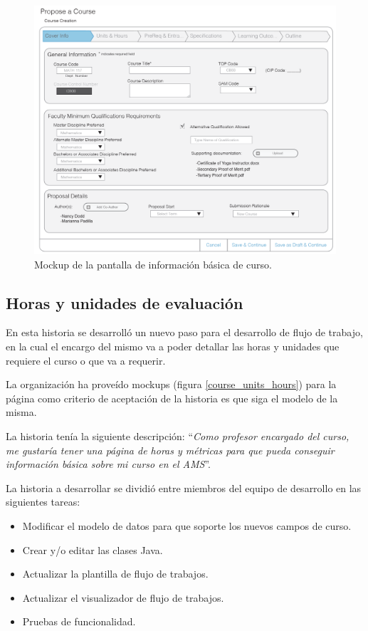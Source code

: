 \begin{figure}[H]
\centering
\includegraphics[scale=0.3]{Capitulos/DesarrollodelaAplicacion/Imagenes/course_cover_info}
\caption{Mockup de la pantalla de información básica de curso.}
  \label{course_cover_info}
\end{figure}

\subsection{Horas y unidades de evaluación}
En esta historia se desarrolló un nuevo paso para el desarrollo de flujo de trabajo, en la cual el encargo del mismo va a poder detallar las horas y unidades que requiere el curso o que va a requerir.

La organización ha proveído mockups (figura \ref{course_units_hours}) para la página como criterio de aceptación de la historia es que siga el modelo de la misma.

La historia tenía la siguiente descripción: \enquote{\textit{Como profesor encargado del curso, me gustaría tener una página de horas y métricas para que pueda conseguir información básica sobre mi curso en el AMS}}.

La historia a desarrollar se dividió entre miembros del equipo de desarrollo en las siguientes tareas:
\begin{itemize}
	\item Modificar el modelo de datos para que soporte los nuevos campos de curso.
	\item Crear y/o editar las clases Java.
	\item Actualizar la plantilla de flujo de trabajos.
	\item Actualizar el visualizador de flujo de trabajos.
	\item Pruebas de funcionalidad.
\end{itemize}

